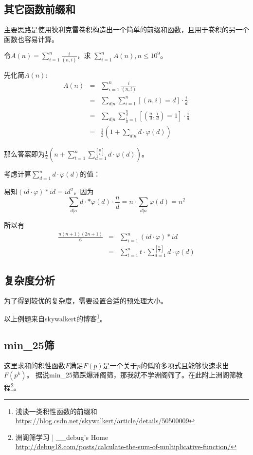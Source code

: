 \subsection{其它函数前缀和}
主要思路是使用狄利克雷卷积构造出一个简单的前缀和函数，且用于卷积的另一个函数也容易计算。

令$\displaystyle A(n)=\sum_{i=1}^n\frac{i}{(n,i)}$，求
$\displaystyle \sum_{i=1}^n{A(n)},n\leq 10^{9}$。

先化简$A(n)$:
\begin{eqnarray*}
	A(n)&=&\sum_{i=1}^n\frac{i}{(n,i)}\\
	&=&\sum_{d|n}{\sum_{i=1}^n{[(n,i)=d]\cdot\frac{i}{d}}}\\
	&=&\sum_{d|n}{\sum_{\frac{i}{d}=1}^{\frac{n}{d}}
	{[(\frac{n}{d},\frac{i}{d})=1]\cdot\frac{i}{d}}}\\
	&=&\frac{1}{2}\left(1+\sum_{d|n}{d\cdot\varphi(d)}\right)
\end{eqnarray*}

那么答案即为$\displaystyle \frac{1}{2}\left(n+\sum_{t=1}^n
	{\sum_{d=1}^{[\frac{n}{t}]}{d\cdot\varphi(d)}}\right)$。

考虑计算$\displaystyle \sum_{d=1}^n{d\cdot\varphi(d)}$的值：

易知$(id\cdot\varphi)*id=id^2$，因为\begin{displaymath}
	\sum_{d|n}d\cdot*\varphi(d)\cdot\frac{n}{d}=
	n\cdot\sum_{d|n}\varphi(d)=n^2
\end{displaymath}

所以有\begin{eqnarray*}
	\frac{n(n+1)(2n+1)}{6}&=&\sum_{i=1}^n{(id\cdot\varphi)*id}\\
	&=&\sum_{t=1}^n{t\cdot\sum_{d=1}^{[\frac{n}{t}]}{d\cdot\varphi(d)}}
\end{eqnarray*}

\subsection{复杂度分析}
为了得到较优的复杂度，需要设置合适的预处理大小。

以上例题来自skywalkert的博客\footnote{浅谈一类积性函数的前缀和\\
	\url{https://blog.csdn.net/skywalkert/article/details/50500009}}。

\subsection{min\_25筛}
这里求和的积性函数$F$满足$F(p)$是一个关于$p$的低阶多项式且能够快速求出$F(p^k)$。
据说min\_25筛踩爆洲阁筛，那我就不学洲阁筛了。在此附上洲阁筛教程\footnote{
	洲阁筛学习 | \_\_debug's Home\\
	\url{http://debug18.com/posts/calculate-the-sum-of-multiplicative-function/}
}。

